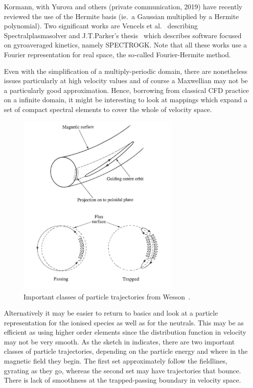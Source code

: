 Kormann, with Yurova and others (private communication, 2019) have recently reviewed the use of 
the Hermite basis (ie.\ a Gaussian multiplied by a Hermite polynomial). Two
significant works are Vencels et al.~\cite{Ve16Spec} describing Spectralplasmasolver
and J.T.Parker's thesis~\cite{jtparker} which describes software focused on
gyroaveraged kinetics, namely SPECTROGK. Note that all these works use a Fourier
representation for real space, the so-called Fourier-Hermite method.

Even with the simplification of a multiply-periodic domain,
there are nonetheless issues particularly at high velocity values
and of course a Maxwellian may not be a particularly good approximation. 
Hence, borrowing from classical CFD practice on a infinite domain, it might be
interesting to look at mappings which expand a set of compact spectral elements to cover
the whole of velocity space.

\begin{figure}
\centerline{\includegraphics[width=8cm]{../png/pcle_orbits}}
\caption{Important classes of particle trajectories from Wesson~\cite[\S\,3.10]{wesson}.\label{fig:orbits}}
\end{figure}

Alternatively it may be easier to return to basics and look at a particle representation
for the ionised species as well as for the neutrals. This
may be as efficient as using higher order elements since the distribution function in velocity may not be
very smooth. As the sketch in  indicates, there are two important classes of particle
trajectories, depending on the particle energy and where in the magnetic field they begin.
The first set approximately follow the fieldlines, gyrating as they go, whereas the second set
may have trajectories that bounce. There is lack of smoothness at the trapped-passing
boundary in velocity space.


